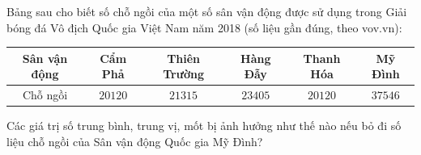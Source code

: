 \begin{ex}
Bảng sau cho biết số chỗ ngồi của một số sân vận động được sử dụng trong Giải bóng đá Vô địch Quốc gia Việt Nam năm 2018 (số liệu gần đúng, theo vov.vn):
\begin{center}
\begin{tabular}{|c|c|c|c|c|c|}\hline
Sân vận động & Cẩm Phả & Thiên Trường & Hàng Đẫy & Thanh Hóa & Mỹ Đình\\\hline
Chỗ ngồi & $20120$ & $21315$ & $23405$ & $20120$ & $37546$\\\hline
\end{tabular}
\end{center}
Các giá trị số trung bình, trung vị, mốt bị ảnh hưởng như thế nào nếu bỏ đi số liệu chỗ ngồi của Sân vận động Quốc gia Mỹ Đình?
\end{ex}
